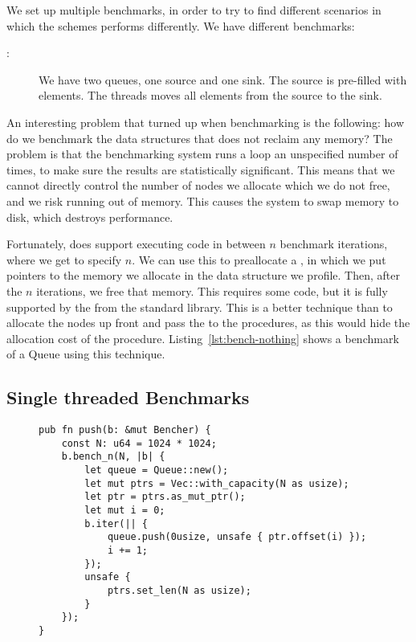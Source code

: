 \documentclass[b5paper]{report}
\begin{document}
We set up multiple benchmarks, in order to try to find different scenarios in
which the schemes performs differently. We have \todo{} different benchmarks:
\begin{description}
  \item[:] We have two queues, one source and one sink. The
    source is pre-filled with  elements. The threads moves all elements
    from the source to the sink.
\end{description}

An interesting problem that turned up when benchmarking is the following: how do
we benchmark the data structures that does not reclaim any memory? The problem
is that the benchmarking system runs a loop an unspecified number of times, to
make sure the results are statistically significant. This means that we cannot directly control the number of nodes
we allocate which we do not free, and we risk running out of memory. This causes
the system to swap memory to disk, which destroys performance.

Fortunately,  does support executing code in between $n$ benchmark
iterations, where we get to specify $n$. We can use this to preallocate a
, in which we put pointers to the memory we allocate in the data
structure we profile. Then, after the $n$ iterations, we free that memory. This
requires some  code, but it is fully supported by the 
from the standard library. This is a better technique than to allocate the nodes
up front and pass the  to the procedures, as this would hide the
allocation cost of the procedure. Listing~\ref{lst:bench-nothing} shows a
benchmark of a Queue using this technique.

\subsection{Single threaded Benchmarks}

\begin{figure}[ht]
  \begin{lstlisting}[caption=Microbenchmark of a data structure without memory
  reclamation,label=lst:bench-nothing]
pub fn push(b: &mut Bencher) {
    const N: u64 = 1024 * 1024;
    b.bench_n(N, |b| {
        let queue = Queue::new();
        let mut ptrs = Vec::with_capacity(N as usize);
        let ptr = ptrs.as_mut_ptr();
        let mut i = 0;
        b.iter(|| {
            queue.push(0usize, unsafe { ptr.offset(i) });
            i += 1;
        });
        unsafe {
            ptrs.set_len(N as usize);
        }
    });
}
  \end{lstlisting}
\end{figure}
\end{document}
